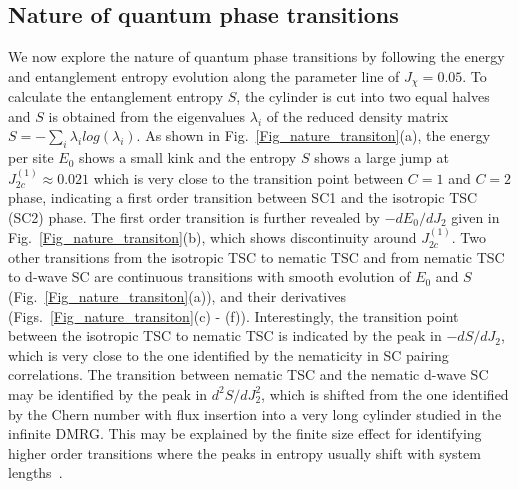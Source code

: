 \documentclass[aps,prx,reprint,superscriptaddress,showpacs]{revtex4-2}
\newcommand{\oim}[1]{{\color{blue} #1}}
\begin{document}
\subsection{Nature of quantum phase transitions}
\label{phase_transition}
 
\oim{We now explore the nature of quantum phase transitions by following the energy and entanglement entropy evolution along the parameter line of $J_{\chi}=0.05$. To  calculate the entanglement entropy $S$, the cylinder is cut into two equal halves and $S$ is  obtained  from the eigenvalues $\lambda_i$ of the reduced density matrix $S =-\sum _{i} \lambda_{i}log (\lambda _{i})$.
As shown in Fig.~\ref{Fig_nature_transiton}(a), the energy per site $E_0$ shows 
a small kink and the entropy $S$ shows a large jump at $J_{2c}^{(1)}\approx 0.021$ which is very close to the transition point between $C=1$ and $C=2$ phase, indicating a first order transition between SC1 and the isotropic TSC (SC2) phase. The first order transition is further revealed by $-dE_{0}/dJ_{2}$ given in Fig.~\ref{Fig_nature_transiton}(b), which shows discontinuity around $J_{2c}^{(1)}$. Two other transitions from the isotropic TSC to nematic TSC and from nematic TSC to d-wave SC are continuous transitions with smooth evolution of $E_{0}$ and $S$ (Fig.~\ref{Fig_nature_transiton}(a)), and their derivatives (Figs.~\ref{Fig_nature_transiton}(c) - (f)). Interestingly, the transition point between the isotropic TSC to nematic TSC is indicated by the peak in $-dS/dJ_{2}$, which is very close to the one identified by the nematicity in SC pairing correlations. The transition between nematic TSC and the nematic d-wave SC may be identified by the peak in $d^{2}S/dJ_{2}^{2}$, which is shifted from the one identified by the Chern number with flux insertion into a very long cylinder studied in the infinite DMRG.  This may be explained by
the finite size effect  for identifying higher order transitions where the peaks in entropy  usually shift with system lengths~\cite{zhong2009quantum,zhang2021fidelity}. }
 
\end{document}
